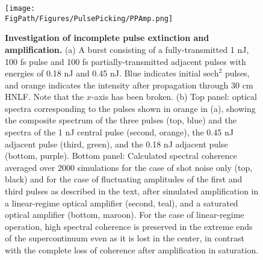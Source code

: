 \begin{figure}[htpb]
	\begin{center}
		\texttt{[image: \\FigPath/Figures/PulsePicking/PPAmp.png]}
	\end{center}
	\caption[Investigation of incomplete pulse extinction and amplification]{\textbf{Investigation of incomplete pulse extinction and amplification.} (a) A burst consisting of a fully-transmitted 1 nJ, 100 fs pulse and 100 fs partially-transmitted adjacent pulses with energies of 0.18 nJ and 0.45 nJ. Blue indicates initial $\mathrm{sech}^2$ pulses, and orange indicates the intensity after propagation through 30 cm HNLF. Note that the $x$-axis has been broken. (b) Top panel: optical spectra corresponding to the pulses shown in orange in (a), showing the composite spectrum of the three pulses (top, blue) and the spectra of the 1 nJ central pulse (second, orange), the 0.45 nJ adjacent pulse (third, green), and the 0.18 nJ adjacent pulse (bottom, purple). Bottom panel: Calculated spectral coherence averaged over 2000 simulations for the case of shot noise only (top, black) and for the case of fluctuating amplitudes of the first and third pulses as described in the text, after simulated amplification in a linear-regime optical amplifier (second, teal), and a saturated optical amplifier (bottom, maroon).  For the case of linear-regime operation, high spectral coherence is preserved in the extreme ends of the supercontinuum even as it is lost in the center, in contrast with the complete loss of coherence after amplification in saturation. 
	\label{fig:PPAmp}}
\end{figure} 

